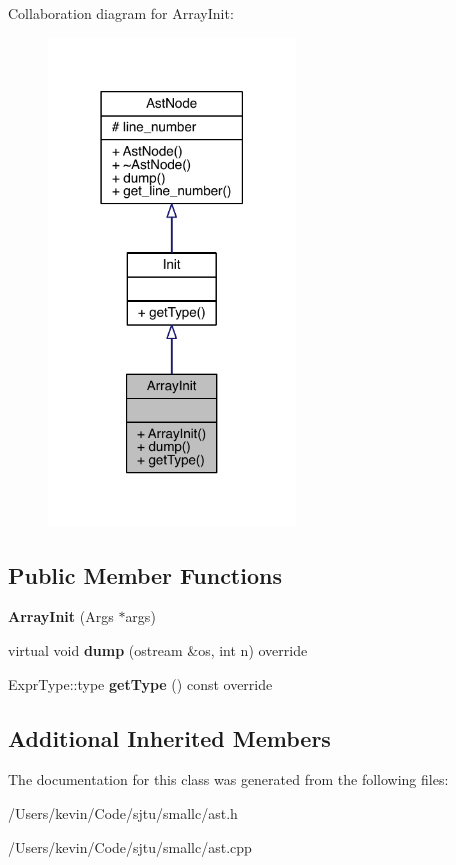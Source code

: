 Collaboration diagram for Array\+Init\+:\nopagebreak
\begin{figure}[H]
\begin{center}
\leavevmode
\includegraphics[width=186pt]{class_array_init__coll__graph}
\end{center}
\end{figure}
\subsection*{Public Member Functions}
\begin{DoxyCompactItemize}
\item 
\mbox{\label{class_array_init_a89b037692e9f57ebc673591fdd397cf5}} 
{\bfseries Array\+Init} (Args $\ast$args)
\item 
\mbox{\label{class_array_init_acbad83cb15fefc75155c10ed512a209a}} 
virtual void {\bfseries dump} (ostream \&os, int n) override
\item 
\mbox{\label{class_array_init_ac7fd7b6aaf5595630deb9ac687867135}} 
Expr\+Type\+::type {\bfseries get\+Type} () const override
\end{DoxyCompactItemize}
\subsection*{Additional Inherited Members}


The documentation for this class was generated from the following files\+:\begin{DoxyCompactItemize}
\item 
/\+Users/kevin/\+Code/sjtu/smallc/ast.\+h\item 
/\+Users/kevin/\+Code/sjtu/smallc/ast.\+cpp\end{DoxyCompactItemize}
